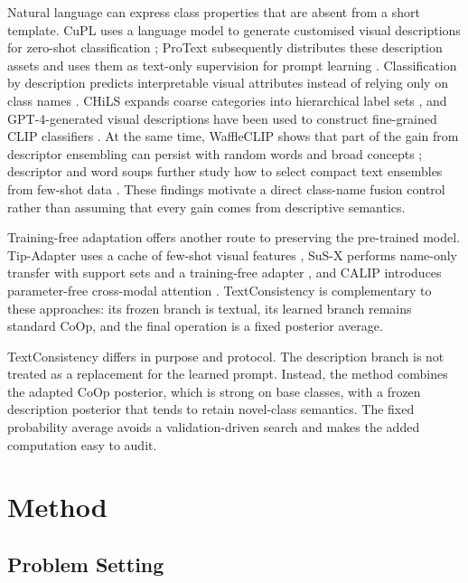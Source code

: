 \documentclass[preprint,12pt]{elsarticle}
\begin{document}
Natural language can express class properties that are absent from a short template. CuPL uses a language model to generate customised visual descriptions for zero-shot classification \cite{pratt2023cupl}; ProText subsequently distributes these description assets and uses them as text-only supervision for prompt learning \cite{khattak2025protext}. Classification by description predicts interpretable visual attributes instead of relying only on class names \cite{menon2023descriptions}. CHiLS expands coarse categories into hierarchical label sets \cite{novack2023chils}, and GPT-4-generated visual descriptions have been used to construct fine-grained CLIP classifiers \cite{maniparambil2023gpt4clip}. At the same time, WaffleCLIP shows that part of the gain from descriptor ensembling can persist with random words and broad concepts \cite{roth2023waffleclip}; descriptor and word soups further study how to select compact text ensembles from few-shot data \cite{liao2024soups}. These findings motivate a direct class-name fusion control rather than assuming that every gain comes from descriptive semantics.

Training-free adaptation offers another route to preserving the pre-trained model. Tip-Adapter uses a cache of few-shot visual features \cite{zhang2022tipadapter}, SuS-X performs name-only transfer with support sets and a training-free adapter \cite{udandarao2023susx}, and CALIP introduces parameter-free cross-modal attention \cite{guo2023calip}. TextConsistency is complementary to these approaches: its frozen branch is textual, its learned branch remains standard CoOp, and the final operation is a fixed posterior average.

TextConsistency differs in purpose and protocol. The description branch is not treated as a replacement for the learned prompt. Instead, the method combines the adapted CoOp posterior, which is strong on base classes, with a frozen description posterior that tends to retain novel-class semantics. The fixed probability average avoids a validation-driven search and makes the added computation easy to audit.

\section{Method}
\label{sec:method}

\subsection{Problem Setting}
\end{document}
